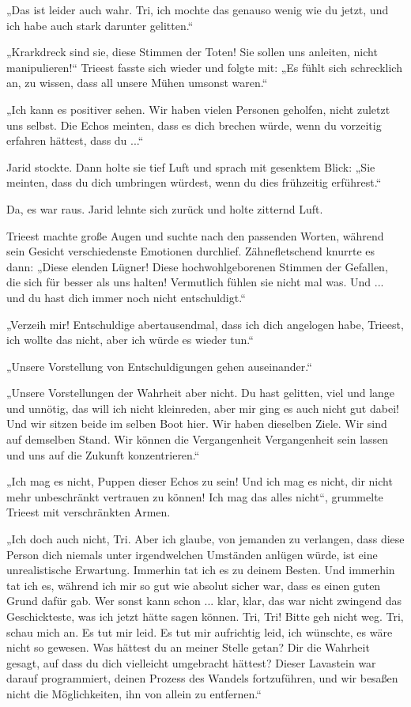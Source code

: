 „Das ist leider auch wahr. Tri, ich mochte das genauso wenig wie du jetzt, und ich habe auch stark darunter gelitten.“

„Krarkdreck sind sie, diese Stimmen der Toten! Sie sollen uns anleiten, nicht manipulieren!“ Trieest fasste sich wieder und folgte mit: „Es fühlt sich schrecklich an, zu wissen, dass all unsere Mühen umsonst waren.“

„Ich kann es positiver sehen. Wir haben vielen Personen geholfen, nicht zuletzt uns selbst. Die Echos meinten, dass es dich brechen würde, wenn du vorzeitig erfahren hättest, dass du ...“

Jarid stockte. Dann holte sie tief Luft und sprach mit gesenktem Blick: „Sie meinten, dass du dich umbringen würdest, wenn du dies frühzeitig erführest.“

Da, es war raus. Jarid lehnte sich zurück und holte zitternd Luft.

Trieest machte große Augen und suchte nach den passenden Worten, während sein Gesicht verschiedenste Emotionen durchlief. Zähnefletschend knurrte es dann: „Diese elenden Lügner! Diese hochwohlgeborenen Stimmen der Gefallen, die sich für besser als uns halten! Vermutlich fühlen sie nicht mal was. Und ... und du hast dich immer noch nicht entschuldigt.“

„Verzeih mir! Entschuldige abertausendmal, dass ich dich angelogen habe, Trieest, ich wollte das nicht, aber ich würde es wieder tun.“

„Unsere Vorstellung von Entschuldigungen gehen auseinander.“

„Unsere Vorstellungen der Wahrheit aber nicht. Du hast gelitten, viel und lange und unnötig, das will ich nicht kleinreden, aber mir ging es auch nicht gut dabei! Und wir sitzen beide im selben Boot hier. Wir haben dieselben Ziele. Wir sind auf demselben Stand. Wir können die Vergangenheit Vergangenheit sein lassen und uns auf die Zukunft konzentrieren.“

„Ich mag es nicht, Puppen dieser Echos zu sein! Und ich mag es nicht, dir nicht mehr unbeschränkt vertrauen zu können! Ich mag das alles nicht“, grummelte Trieest mit verschränkten Armen.

„Ich doch auch nicht, Tri. Aber ich glaube, von jemanden zu verlangen, dass diese Person dich niemals unter irgendwelchen Umständen anlügen würde, ist eine unrealistische Erwartung. Immerhin tat ich es zu deinem Besten. Und immerhin tat ich es, während ich mir so gut wie absolut sicher war, dass es einen guten Grund dafür gab. Wer sonst kann schon ... klar, klar, das war nicht zwingend das Geschickteste, was ich jetzt hätte sagen können. Tri, Tri! Bitte geh nicht weg. Tri, schau mich an. Es tut mir leid. Es tut mir aufrichtig leid, ich wünschte, es wäre nicht so gewesen. Was hättest du an meiner Stelle getan? Dir die Wahrheit gesagt, auf dass du dich vielleicht umgebracht hättest? Dieser Lavastein war darauf programmiert, deinen Prozess des Wandels fortzuführen, und wir besaßen nicht die Möglichkeiten, ihn von allein zu entfernen.“

